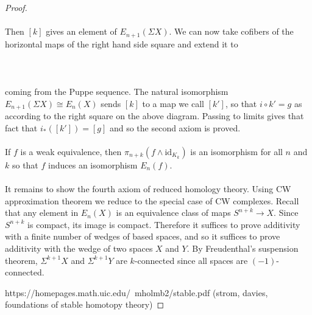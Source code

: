 \documentclass[a4paper]{article}
\begin{document}
\begin{thm}{}{}
\begin{proof}
{}\\~\\
Then $[k]$ gives an element of $E_{n+1}(\Sigma X)$. We can now take cofibers of the horizontal maps of the right hand side square and extend it to \\~\\
\\~\\
coming from the Puppe sequence. The natural isomorphism $E_{n+1}(\Sigma X)\cong E_n(X)$ sends $[k]$ to a map we call $[k']$, so that $i\circ k'=g$ as according to the right square on the above diagram. Passing to limits gives that fact that $i_\ast([k'])=[g]$ and so the second axiom is proved. \\~\\

If $f$ is a weak equivalence, then $\pi_{n+k}(f\wedge\text{id}_{K_k})$ is an isomorphism for all $n$ and $k$ so that $f$ induces an isomorphism $E_n(f)$. \\~\\

It remains to show the fourth axiom of reduced homology theory. Using CW approximation theorem we reduce to the special case of CW complexes. Recall that any element in $E_n(X)$ is an equivalence class of maps $S^{n+k}\to X$. Since $S^{n+k}$ is compact, its image is compact. Therefore it suffices to prove additivity with a finite number of wedges of based spaces, and so it suffices to prove additivity with the wedge of two spaces $X$ and $Y$. By Freudenthal's suspension theorem, $\Sigma^{k+1}X$ and $\Sigma^{k+1}Y$ are $k$-connected since all spaces are $(-1)$-connected. 

https://homepages.math.uic.edu/~mholmb2/stable.pdf (strom, davies, foundations of stable homotopy theory)
\end{proof}
\end{thm}
\end{document}
